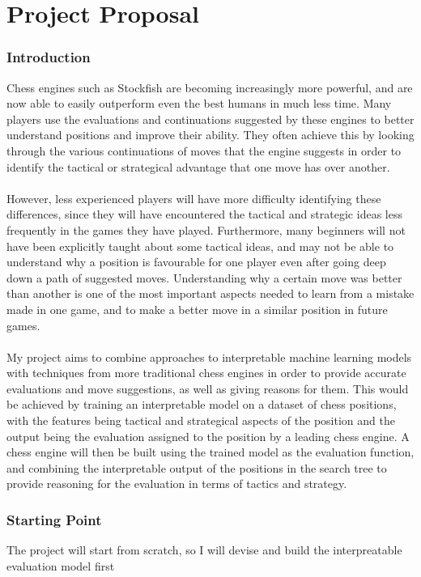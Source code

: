 \documentclass[12pt,a4paper]{article}
\begin{document}
\part*{Project Proposal}
\section*{Introduction}
Chess engines such as Stockfish are becoming increasingly more powerful, and are now able to easily outperform even the best humans in much less time. Many players use the evaluations and continuations suggested by these engines to better understand positions and improve their ability. They often achieve this by looking through the various continuations of moves that the engine suggests in order to identify the tactical or strategical advantage that one move has over another.
\\\\
However, less experienced players will have more difficulty identifying these differences, since they will have encountered the tactical and strategic ideas less frequently in the games they have played. Furthermore, many beginners will not have been explicitly taught about some tactical ideas, and may not be able to understand why a position is favourable for one player even after going deep down a path of suggested moves. Understanding why a certain move was better than another is one of the most important aspects needed to learn from a mistake made in one game, and to make a better move in a similar position in future games.
\\\\
My project aims to combine approaches to interpretable machine learning models with techniques from more traditional chess engines in order to provide accurate evaluations and move suggestions, as well as giving reasons for them. This would be achieved by training an interpretable model on a dataset of chess positions, with the features being tactical and strategical aspects of the position and the output being the evaluation assigned to the position by a leading chess engine. A chess engine will then be built using the trained model as the evaluation function, and combining the interpretable output of the positions in the search tree to provide reasoning for the evaluation in terms of tactics and strategy.

\section*{Starting Point}
The project will start from scratch, so I will devise and build the interpreatable evaluation model first
\end{document}
